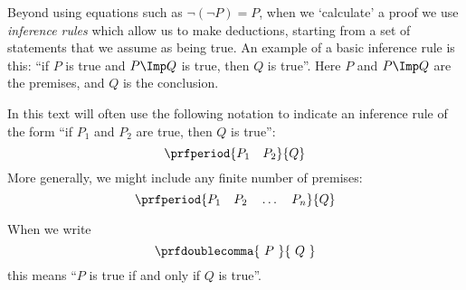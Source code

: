 Beyond using equations such as $\lnot (\lnot P) = P$, when we `calculate' a proof we use \emph{inference rules} which allow us to make deductions, starting from a set of statements that we assume as being true.
An example of a basic inference rule is this: ``if $P$ is true and $P \Imp Q$ is true, then $Q$ is true''.
Here $P$ and $P \Imp Q$ are the premises, and $Q$ is the conclusion.

In this text will often use the following notation to indicate an inference rule of the form ``if $P_1$ and $P_2$ are true, then $Q$ is true'':
\begin{equation}
    \prfperiod{
        P_1 \quad P_2
    }{
        Q
    }
\end{equation}
More generally, we might include any finite number of premises:
\begin{equation}
    \prfperiod{
        P_1 \quad P_2 \quad \dots \quad P_n
    }{
        Q
    }
\end{equation}

When we write
\begin{equation}
    \prfdoublecomma{
        \ P \
    }{
        \ Q \
    }
\end{equation}
this means ``$P$ is true if and only if $Q$ is true''.
